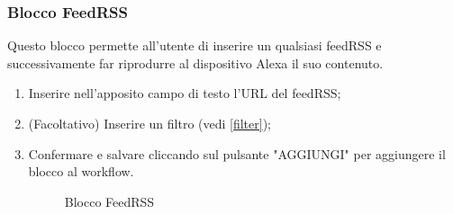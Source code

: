 \subsubsection{Blocco FeedRSS}
Questo blocco permette all'utente di inserire un qualsiasi feedRSS e successivamente far riprodurre al dispositivo Alexa il suo contenuto.
\begin{enumerate}
	\item Inserire nell'apposito campo di testo l'URL del feedRSS;
	\item (Facoltativo) Inserire un filtro (vedi \ref{filter});
	\item Confermare e salvare cliccando sul pulsante "AGGIUNGI" per aggiungere il blocco al workflow.
	\begin{figure}[!ht]
		\centering
		\caption{Blocco FeedRSS}
	\end{figure}
\end{enumerate}
\newpage
